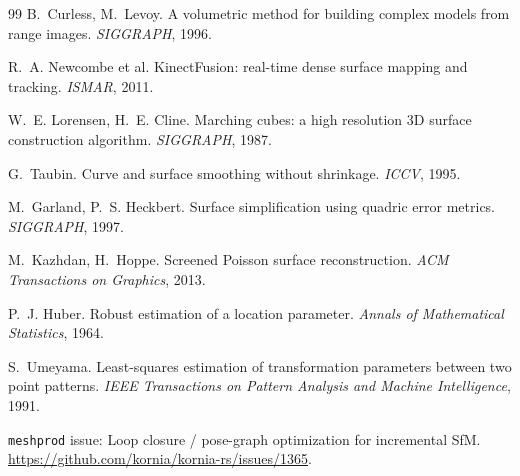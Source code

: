 \documentclass[11pt,a4paper]{article}
\newcommand{\code}[1]{\texttt{#1}}
\begin{document}
\begin{thebibliography}{99}
 B.~Curless, M.~Levoy. A volumetric method for building complex models
from range images. \emph{SIGGRAPH}, 1996.

 R.~A. Newcombe et al. KinectFusion: real-time dense surface mapping and
tracking. \emph{ISMAR}, 2011.

 W.~E. Lorensen, H.~E. Cline. Marching cubes: a high resolution 3D surface
construction algorithm. \emph{SIGGRAPH}, 1987.

 G.~Taubin. Curve and surface smoothing without shrinkage. \emph{ICCV}, 1995.

 M.~Garland, P.~S. Heckbert. Surface simplification using quadric error
metrics. \emph{SIGGRAPH}, 1997.

 M.~Kazhdan, H.~Hoppe. Screened Poisson surface reconstruction. \emph{ACM
Transactions on Graphics}, 2013.

 P.~J. Huber. Robust estimation of a location parameter. \emph{Annals of
Mathematical Statistics}, 1964.

 S.~Umeyama. Least-squares estimation of transformation parameters between
two point patterns. \emph{IEEE Transactions on Pattern Analysis and Machine Intelligence}, 1991.

 \code{meshprod} issue: Loop closure / pose-graph optimization for
incremental SfM. \url{https://github.com/kornia/kornia-rs/issues/1365}.

\end{thebibliography}
\end{document}
